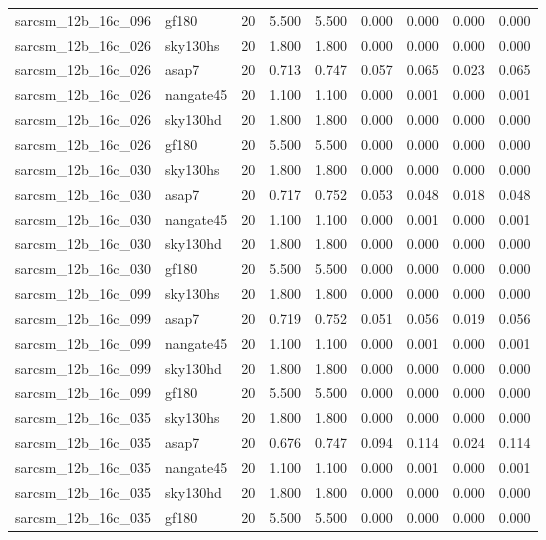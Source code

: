 \begin{tabular}{llrrrrrrr}
sarcsm\_12b\_16c\_096 & gf180 & 20 & 5.500 & 5.500 & 0.000 & 0.000 & 0.000 & 0.000 \\
sarcsm\_12b\_16c\_026 & sky130hs & 20 & 1.800 & 1.800 & 0.000 & 0.000 & 0.000 & 0.000 \\
sarcsm\_12b\_16c\_026 & asap7 & 20 & 0.713 & 0.747 & 0.057 & 0.065 & 0.023 & 0.065 \\
sarcsm\_12b\_16c\_026 & nangate45 & 20 & 1.100 & 1.100 & 0.000 & 0.001 & 0.000 & 0.001 \\
sarcsm\_12b\_16c\_026 & sky130hd & 20 & 1.800 & 1.800 & 0.000 & 0.000 & 0.000 & 0.000 \\
sarcsm\_12b\_16c\_026 & gf180 & 20 & 5.500 & 5.500 & 0.000 & 0.000 & 0.000 & 0.000 \\
sarcsm\_12b\_16c\_030 & sky130hs & 20 & 1.800 & 1.800 & 0.000 & 0.000 & 0.000 & 0.000 \\
sarcsm\_12b\_16c\_030 & asap7 & 20 & 0.717 & 0.752 & 0.053 & 0.048 & 0.018 & 0.048 \\
sarcsm\_12b\_16c\_030 & nangate45 & 20 & 1.100 & 1.100 & 0.000 & 0.001 & 0.000 & 0.001 \\
sarcsm\_12b\_16c\_030 & sky130hd & 20 & 1.800 & 1.800 & 0.000 & 0.000 & 0.000 & 0.000 \\
sarcsm\_12b\_16c\_030 & gf180 & 20 & 5.500 & 5.500 & 0.000 & 0.000 & 0.000 & 0.000 \\
sarcsm\_12b\_16c\_099 & sky130hs & 20 & 1.800 & 1.800 & 0.000 & 0.000 & 0.000 & 0.000 \\
sarcsm\_12b\_16c\_099 & asap7 & 20 & 0.719 & 0.752 & 0.051 & 0.056 & 0.019 & 0.056 \\
sarcsm\_12b\_16c\_099 & nangate45 & 20 & 1.100 & 1.100 & 0.000 & 0.001 & 0.000 & 0.001 \\
sarcsm\_12b\_16c\_099 & sky130hd & 20 & 1.800 & 1.800 & 0.000 & 0.000 & 0.000 & 0.000 \\
sarcsm\_12b\_16c\_099 & gf180 & 20 & 5.500 & 5.500 & 0.000 & 0.000 & 0.000 & 0.000 \\
sarcsm\_12b\_16c\_035 & sky130hs & 20 & 1.800 & 1.800 & 0.000 & 0.000 & 0.000 & 0.000 \\
sarcsm\_12b\_16c\_035 & asap7 & 20 & 0.676 & 0.747 & 0.094 & 0.114 & 0.024 & 0.114 \\
sarcsm\_12b\_16c\_035 & nangate45 & 20 & 1.100 & 1.100 & 0.000 & 0.001 & 0.000 & 0.001 \\
sarcsm\_12b\_16c\_035 & sky130hd & 20 & 1.800 & 1.800 & 0.000 & 0.000 & 0.000 & 0.000 \\
sarcsm\_12b\_16c\_035 & gf180 & 20 & 5.500 & 5.500 & 0.000 & 0.000 & 0.000 & 0.000 \\

\end{tabular}
